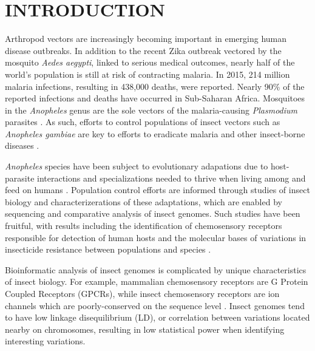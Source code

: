 \chapter{\uppercase{Introduction}}

Arthropod vectors are increasingly becoming important in emerging human disease outbreaks.  In addition to the recent Zika outbreak vectored by the mosquito \emph{Aedes aegypti}, linked to serious medical outcomes, nearly half of the world's population is still at risk of contracting malaria.  In 2015, 214 million malaria infections, resulting in 438,000 deaths, were reported. Nearly 90\% of the reported infections and deaths have occurred in Sub-Saharan Africa.  Mosquitoes in the \emph{Anopheles} genus are the sole vectors of the malaria-causing \emph{Plasmodium} parasites \cite{Neafsey2015,Neafsey2010,Lawniczak2010}. As such, efforts to control populations of insect vectors such as \emph{Anopheles gambiae} are key to efforts to eradicate malaria and other insect-borne diseases \cite{Holt2002}.

\emph{Anopheles} species have been subject to evolutionary adapations due to host-parasite interactions and specializations needed to thrive when living among and feed on humans \cite{Neafsey2015}. Population control efforts are informed through studies of insect biology and characterizerations of these adaptations, which are enabled by sequencing and comparative analysis of insect genomes.   Such studies have been fruitful, with results including the identification of chemosensory receptors responsible for detection of human hosts and the molecular bases of variations in insecticide resistance between populations and species \cite{Lawniczak2010}.

Bioinformatic analysis of insect genomes is complicated by unique characteristics of insect biology.  For example, mammalian chemosensory receptors are G Protein Coupled Receptors (GPCRs), while insect chemosensory receptors are ion channels which are poorly-conserved on the sequence level \cite{Sato2008,Touhara2009,Wicher2008}.  Insect genomes tend to have low linkage disequilibrium (LD), or correlation  between variations located nearby on chromosomes, resulting in low statistical power when identifying interesting variations.

